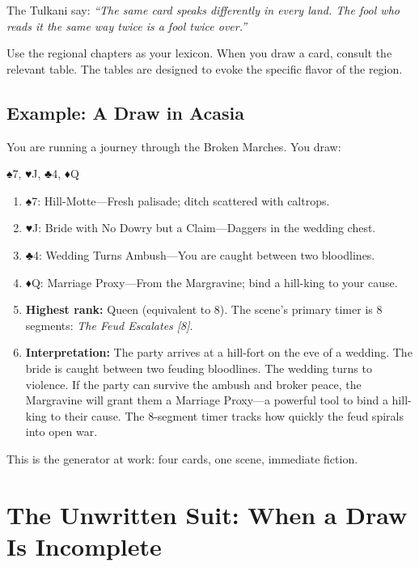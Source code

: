 \documentclass[12pt,oneside]{book}
\renewcommand{\spadesuit}{♠}
\renewcommand{\heartsuit}{♥}
\renewcommand{\clubsuit}{♣}
\renewcommand{\diamondsuit}{♦}
\begin{document}
The Tulkani say: \textit{``The same card speaks differently in every land. The fool who reads it the same way twice is a fool twice over.''}

Use the regional chapters as your lexicon. When you draw a card, consult the relevant table. The tables are designed to evoke the specific flavor of the region.

\subsection*{Example: A Draw in Acasia}

You are running a journey through the Broken Marches. You draw:

\begin{center}
\spadesuit 7, \quad \heartsuit J, \quad \clubsuit 4, \quad \diamondsuit Q
\end{center}

\begin{enumerate}
    \item \spadesuit 7: Hill-Motte---Fresh palisade; ditch scattered with caltrops.
    \item \heartsuit J: Bride with No Dowry but a Claim---Daggers in the wedding chest.
    \item \clubsuit 4: Wedding Turns Ambush---You are caught between two bloodlines.
    \item \diamondsuit Q: Marriage Proxy---From the Margravine; bind a hill-king to your cause.
    \item \textbf{Highest rank:} Queen (equivalent to 8). The scene's primary timer is 8 segments: \textit{The Feud Escalates [8]}.
    \item \textbf{Interpretation:} The party arrives at a hill-fort on the eve of a wedding. The bride is caught between two feuding bloodlines. The wedding turns to violence. If the party can survive the ambush and broker peace, the Margravine will grant them a Marriage Proxy---a powerful tool to bind a hill-king to their cause. The 8-segment timer tracks how quickly the feud spirals into open war.
\end{enumerate}

This is the generator at work: four cards, one scene, immediate fiction.

\section*{The Unwritten Suit: When a Draw Is Incomplete}
\end{document}
